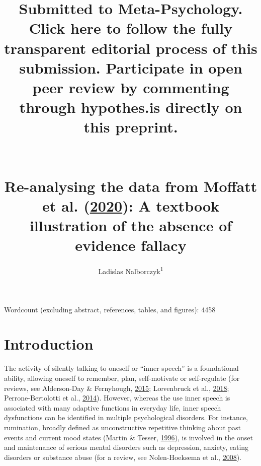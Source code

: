 \documentclass[
  english,
  man, donotrepeattitle,floatsintext]{apa6}
\author{Ladislas Nalborczyk\textsuperscript{1}}
\affiliation{
\vspace{0.5cm}
\textsuperscript{1} Univ. Grenoble Alpes, CNRS, Grenoble INP, GIPSA-lab, 38000 Grenoble, France}
\title{\textbf{Submitted to Meta-Psychology. Click here to follow the fully transparent editorial process of this submission. Participate in open peer review by commenting through hypothes.is directly on this preprint.}\\
~\\
~\\
Re-analysing the data from Moffatt et al. (\protect\hyperlink{ref-moffatt_inner_2020}{2020}): A textbook illustration of the absence of evidence fallacy}
\date{}
\begin{document}
\maketitle

Wordcount (excluding abstract, references, tables, and figures): 4458

\newpage

\hypertarget{introduction}{%
\section{Introduction}\label{introduction}}

The activity of silently talking to oneself or ``inner speech'' is a foundational ability, allowing oneself to remember, plan, self-motivate or self-regulate (for reviews, see Alderson-Day \& Fernyhough, \protect\hyperlink{ref-alderson-day_inner_2015}{2015}; Lœvenbruck et al., \protect\hyperlink{ref-loevenbruck_cognitive_2018}{2018}; Perrone-Bertolotti et al., \protect\hyperlink{ref-perrone-bertolotti_what_2014}{2014}). However, whereas the use inner speech is associated with many adaptive functions in everyday life, inner speech dysfunctions can be identified in multiple psychological disorders. For instance, rumination, broadly defined as unconstructive repetitive thinking about past events and current mood states (Martin \& Tesser, \protect\hyperlink{ref-Martin}{1996}), is involved in the onset and maintenance of serious mental disorders such as depression, anxiety, eating disorders or substance abuse (for a review, see Nolen-Hoeksema et al., \protect\hyperlink{ref-Nolen-Hoeksema2008}{2008}).
\end{document}
